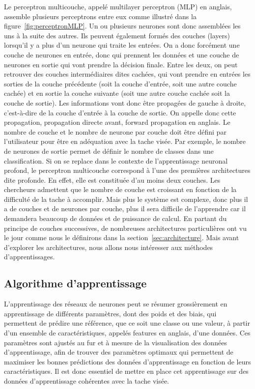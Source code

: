 
Le perceptron multicouche, appelé multilayer perceptron (MLP) en anglais, assemble plusieurs perceptrons entre eux comme illustré dans la figure~\ref{fig:perceptronMLP}. Un ou plusieurs neurones sont donc assemblées les uns à la suite des autres. Ils peuvent également formés des couches (layers) lorsqu'il y a plus d'un neurone qui traite les entrées. On a donc forcément une couche de neurones en entrée, donc qui prennent les données et une couche de neurones en sortie qui vont prendre la décision finale. Entre les deux, on peut retrouver des couches intermédiaires dites cachées, qui vont prendre en entrées les sorties de la couche précédente (soit la couche d'entrée, soit une autre couche cachée) et en sortie la couche suivante (soit une autre couche cachée soit la couche de sortie).
Les informations vont donc être propagées de gauche à droite, c'est-à-dire de la couche d'entrée à la couche de sortie. On appelle donc cette propagation, propagation directe avant, forward propagation en anglais. Le nombre de couche et le nombre de neurone par couche doit être défini par l'utilisateur pour être en adéquation avec la tache visée. Par exemple, le nombre de neurones de sortie permet de définir le nombre de classes dans une classification.
Si on se replace dans le contexte de l'apprentissage neuronal profond, le perceptron multicouche correspond à l'une des premières architectures dite profonde. En effet, elle est constituée d'au moins deux couches. Les chercheurs admettent que le nombre de couche est croissant en fonction de la difficulté de la tache à accomplir. Mais plus le système est complexe, donc plus il a de couches et de neurones par couche, plus il sera difficile de l'apprendre car il demandera beaucoup de données et de puissance de calcul.
En partant du principe de couches successives, de nombreuses architectures particulières ont vu le jour comme nous le définirons dans la section~\ref{sec:architecture}. Mais avant d'explorer les architectures, nous allons nous intéresser aux méthodes d'apprentissages.

\subsection{Algorithme d'apprentissage}
L'apprentissage des réseaux de neurones peut se résumer grossièrement en apprentissage de différents paramètres, dont des poids et des biais, qui permettent de prédire une référence, que ce soit une classe ou une valeur, à partir d'un ensemble de caractéristiques, appelés features en anglais, d'une données. Ces paramètres sont ajustés au fur et à mesure de la visualisation des données d'apprentissage, afin de trouver des paramètres optimaux qui permettent de maximiser les bonnes prédictions des données d'apprentissage en fonction de leurs caractéristiques. Il est donc essentiel de mettre en place cet apprentissage sur des données d'apprentissage cohérentes avec la tache visée.

